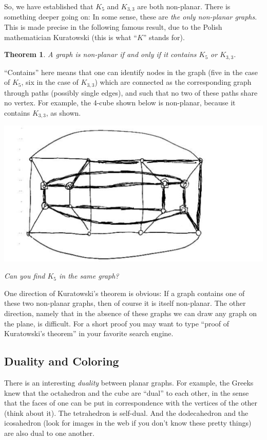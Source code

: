 \documentclass[11pt]{article}
\newcounter{thm}
\newtheorem{theorem}{Theorem}[thm]
\begin{document}
So, we have established that $K_5$ and $K_{3,3}$ are both
non-planar.  There is something deeper going on:  In some sense,
these are {\em the only non-planar graphs}.  This is made precise in the following famous
result, due to the Polish mathematician Kuratowski (this is what
``$K$'' stands for).

\begin{theorem} A graph is non-planar if and only if it contains
$K_5$ or $K_{3,3}$.
\end{theorem}

``Contains'' here means that one can identify nodes in the graph
(five in the case of $K_5$, six in the case of $K_{3,3}$) which are
connected as the corresponding graph through paths (possibly single
edges), and such that no two of these paths share no vertex.  For
example, the 4-cube shown below is non-planar, because it contains
$K_{3,3}$, as shown.

\includegraphics[scale=0.5]{figures/graphs_2}

{\em Can you find $K_5$ in the same graph?}

One direction of Kuratowski's theorem is obvious:  If a graph
contains one of these two non-planar graphs, then of course it is
itself non-planar.  The other direction, namely that in the absence
of these graphs we can draw any graph on the plane, is difficult.
For a short proof you may want to type ``proof of Kuratowski's
theorem'' in your favorite search engine.

\subsection*{Duality and Coloring}
There is an interesting {\em duality} between planar graphs.  For
example, the Greeks knew that the octahedron and the cube are
``dual'' to each other, in the sense that the faces of one can be
put in correspondence with the vertices of the other (think about
it).  The tetrahedron is self-dual.  And the dodecahedron and the
icosahedron (look for images in the web if you don't know these
pretty things) are also dual to one another.
\end{document}
